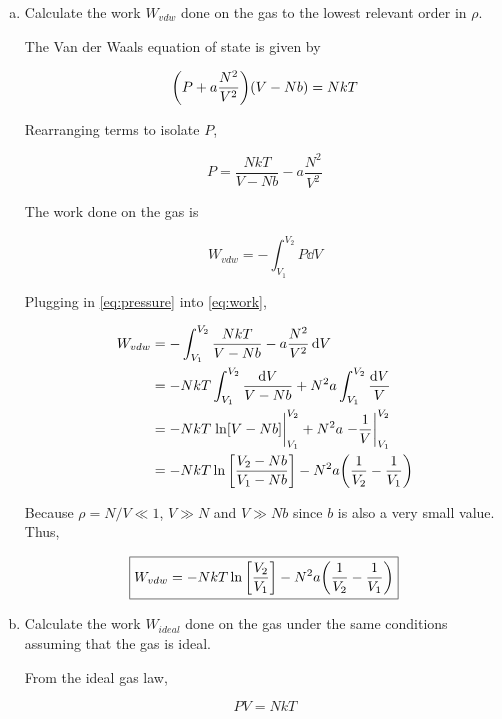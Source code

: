\documentclass[9pt,a4paper,twocolumn]{article}
\begin{document}
\begin{enumerate}[(a)]

\item Calculate the work $W_{vdw}$ done on the gas to the lowest relevant order in $\rho$.

The Van der Waals equation of state is given by

\begin{equation}\label{eq:vanderwaals}
	\qty(P + a\frac{N^2}{V^2})\qty(V-Nb) = NkT
\end{equation}

Rearranging terms to isolate $P$,

\begin{equation}\label{eq:pressure}
	P = \frac{NkT}{V-Nb} - a\frac{N^2}{V^2}
\end{equation}

The work done on the gas is

\begin{equation}\label{eq:work}
	W_{vdw} = -\int_{V_1}^{V_2} P \dd{V}
\end{equation}

Plugging in \eqref{eq:pressure} into \eqref{eq:work},

\begin{align}
	W_{vdw} &= -\int_{V_1}^{V_2} \frac{NkT}{V-Nb} - a\frac{N^2}{V^2} \dd{V} \nonumber \\
	&= -NkT \int_{V_1}^{V_2} \frac{\dd{V}}{V-Nb} + N^2 a \int_{V_1}^{V_2} \frac{\dd{V}}{V} \nonumber \\
	&= -NkT\eval{\ln[V - Nb]}_{V_1}^{V_2} + N^2 a \eval{-\frac{1}{V}}_{V_1}^{V_2} \nonumber \\
	&= -NkT\ln\qty[\frac{V_2 - Nb}{V_1 - Nb}] - N^2 a\qty(\frac{1}{V_2	} - \frac{1}{V_1}) \nonumber
\end{align}	

Because $\rho = N/V \ll 1$, $V \gg N$ and $V \gg Nb$ since $b$ is also a very small value. Thus,

\begin{equation}
	\boxed{
		W_{vdw} = -NkT\ln\qty[\frac{V_2}{V_1}] - N^2a\qty(\frac{1}{V_2} - \frac{1}{V_1})
	}
\end{equation}

\item Calculate the work $W_{ideal}$ done on the gas under the same conditions assuming that the gas is ideal.

From the ideal gas law,

\begin{equation}
	PV = NkT
\end{equation}


\end{enumerate}
\end{document}
